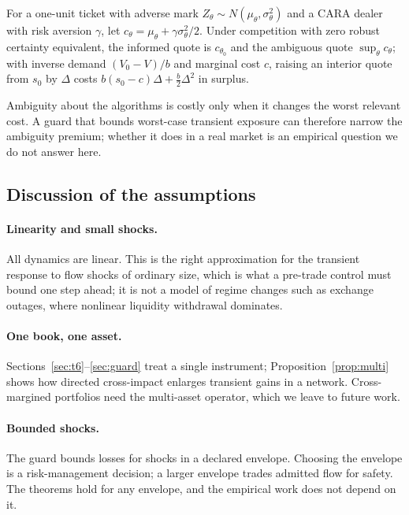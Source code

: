 \begin{proposition}\label{prop:ambig}
For a one-unit ticket with adverse mark $Z_\theta\sim N(\mu_\theta,\sigma_\theta^2)$ and a CARA dealer with risk aversion $\gamma$, let $c_\theta=\mu_\theta+\gamma\sigma_\theta^2/2$. Under competition with zero robust certainty equivalent, the informed quote is $c_{\theta_0}$ and the ambiguous quote $\sup_\theta c_\theta$; with inverse demand $(V_0-V)/b$ and marginal cost $c$, raising an interior quote from $s_0$ by $\Delta$ costs $b(s_0-c)\Delta+\tfrac b2\Delta^2$ in surplus.
\end{proposition}

Ambiguity about the algorithms is costly only when it changes the worst relevant cost. A guard that bounds worst-case transient exposure can therefore narrow the ambiguity premium; whether it does in a real market is an empirical question we do not answer here.

\subsection{Discussion of the assumptions}

\paragraph{Linearity and small shocks.} All dynamics are linear. This is the right approximation for the transient response to flow shocks of ordinary size, which is what a pre-trade control must bound one step ahead; it is not a model of regime changes such as exchange outages, where nonlinear liquidity withdrawal dominates.

\paragraph{One book, one asset.} Sections~\ref{sec:t6}--\ref{sec:guard} treat a single instrument; Proposition~\ref{prop:multi} shows how directed cross-impact enlarges transient gains in a network. Cross-margined portfolios need the multi-asset operator, which we leave to future work.

\paragraph{Bounded shocks.} The guard bounds losses for shocks in a declared envelope. Choosing the envelope is a risk-management decision; a larger envelope trades admitted flow for safety. The theorems hold for any envelope, and the empirical work does not depend on it.


